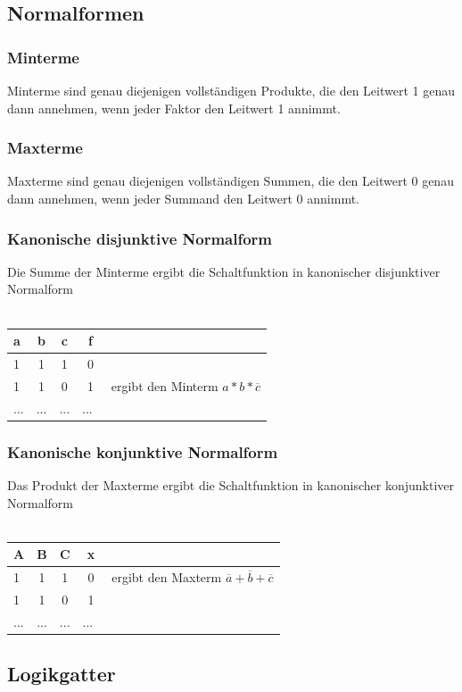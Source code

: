 \documentclass[a4paper,12pt]{scrartcl}
\begin{document}
\subsection{Normalformen}

\subsubsection{Minterme}
Minterme sind genau diejenigen vollständigen Produkte, die den Leitwert 1 genau dann annehmen, wenn jeder Faktor den Leitwert 1 annimmt.
\subsubsection{Maxterme}
Maxterme sind genau diejenigen vollständigen Summen, die den Leitwert 0 genau dann annehmen, wenn jeder Summand den Leitwert 0 annimmt.
\subsubsection{Kanonische disjunktive Normalform}
Die Summe der Minterme ergibt die Schaltfunktion in kanonischer disjunktiver Normalform \\ \\
\begin{tabular}{lcc|cc}
  a & b& c & f & \\
  \hline
  1 & 1 & 1 & 0 & \\
  1 & 1 & 0 & 1 & ergibt den Minterm $a * b * \overline{c}$\\
  ... & ... & ... & ...\
\end{tabular}
\subsubsection{Kanonische konjunktive Normalform}
Das Produkt der Maxterme ergibt die Schaltfunktion in kanonischer konjunktiver Normalform
 \\ \\
\begin{tabular}{lcc|cc}
  A & B & C & x & \\
  \hline
  1 & 1 & 1 & 0 & ergibt den Maxterm $\overline{a} + \overline{b} + \overline{c}$\\
  1 & 1 & 0 & 1 & \\
  ... & ... & ... & ...\
\end{tabular}

\newpage

\subsection{Logikgatter}
\end{document}
